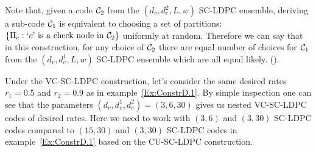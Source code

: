 \begin{remark}\label{Rmk:EquivNestedConstr2}
Note that, given a code $\mathcal{C}_{2}$ from the $(d_{v},d_{c}^{2},L,w)$ SC-LDPC ensemble, deriving a sub-code $\mathcal{C}_{1}$ is equivalent to choosing a set of partitions: $\{\Pi_{c}: \text{`}c\text{' is a check node in } \mathcal{C}_{2}\}$ uniformly at random. Therefore we can say that in this construction, for any choice of $\mathcal{C}_{2}$ there are equal number of choices for $\mathcal{C}_{1}$ from the $(d_{v},d_{c}^{1},L,w)$ SC-LDPC ensemble which are all equal likely. \iflonger
({\color{red}{I use this fact later in one of the proofs, but not sure about where to place this remark}}).
\fi
\end{remark}


\begin{example}\label{Ex:ConstrD.2}
Under the VC-SC-LDPC construction, let's consider the same desired rates $r_{1}=0.5$ and $r_{2}=0.9$ as in example~\ref{Ex:ConstrD.1}. By simple inspection one can see that the parameters $(d_{v},d_{c}^{1},d_{c}^{2})=(3,6,30)$ gives us nested VC-SC-LDPC codes of desired rates. Here we need to work with $(3,6)$ and $(3,30)$ SC-LDPC codes compared to $(15,30)$ and $(3,30)$ SC-LDPC codes in example~\ref{Ex:ConstrD.1} based on the CU-SC-LDPC construction.
\end{example}

